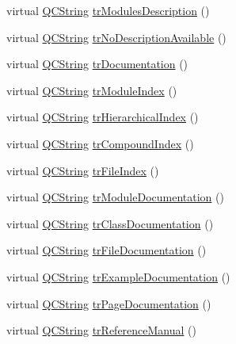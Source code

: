 \begin{DoxyCompactItemize}
\item 
virtual \mbox{\hyperlink{class_q_c_string}{Q\+C\+String}} \mbox{\hyperlink{class_translator_norwegian_adbf4e95c60739c0f92fdcd595f9e6451}{tr\+Modules\+Description}} ()
\item 
virtual \mbox{\hyperlink{class_q_c_string}{Q\+C\+String}} \mbox{\hyperlink{class_translator_norwegian_a69b521875e92a6d28d464f1899a45ed3}{tr\+No\+Description\+Available}} ()
\item 
virtual \mbox{\hyperlink{class_q_c_string}{Q\+C\+String}} \mbox{\hyperlink{class_translator_norwegian_aaeef151315b77ece7d99362d620b72f4}{tr\+Documentation}} ()
\item 
virtual \mbox{\hyperlink{class_q_c_string}{Q\+C\+String}} \mbox{\hyperlink{class_translator_norwegian_a59ac28b655bef6be63d1031aa8716eb6}{tr\+Module\+Index}} ()
\item 
virtual \mbox{\hyperlink{class_q_c_string}{Q\+C\+String}} \mbox{\hyperlink{class_translator_norwegian_af7745b75b85b42d0d9fa02f706f3a705}{tr\+Hierarchical\+Index}} ()
\item 
virtual \mbox{\hyperlink{class_q_c_string}{Q\+C\+String}} \mbox{\hyperlink{class_translator_norwegian_a6d566b4eae7efeff34766a62523ae7cc}{tr\+Compound\+Index}} ()
\item 
virtual \mbox{\hyperlink{class_q_c_string}{Q\+C\+String}} \mbox{\hyperlink{class_translator_norwegian_a2fe4f0090ea4b14ab7624ea3ced45e64}{tr\+File\+Index}} ()
\item 
virtual \mbox{\hyperlink{class_q_c_string}{Q\+C\+String}} \mbox{\hyperlink{class_translator_norwegian_a28824c22c658ed3f6d166de628d202c1}{tr\+Module\+Documentation}} ()
\item 
virtual \mbox{\hyperlink{class_q_c_string}{Q\+C\+String}} \mbox{\hyperlink{class_translator_norwegian_aae6f1f2f29b67ff9410077edbc6910fd}{tr\+Class\+Documentation}} ()
\item 
virtual \mbox{\hyperlink{class_q_c_string}{Q\+C\+String}} \mbox{\hyperlink{class_translator_norwegian_a8c2958c015db8ddd54a00387e6a5faad}{tr\+File\+Documentation}} ()
\item 
virtual \mbox{\hyperlink{class_q_c_string}{Q\+C\+String}} \mbox{\hyperlink{class_translator_norwegian_a8b0d3f953b275be330604a73f4d2367e}{tr\+Example\+Documentation}} ()
\item 
virtual \mbox{\hyperlink{class_q_c_string}{Q\+C\+String}} \mbox{\hyperlink{class_translator_norwegian_a4bc20393742ef7e9a05a8e63ae3b01a3}{tr\+Page\+Documentation}} ()
\item 
virtual \mbox{\hyperlink{class_q_c_string}{Q\+C\+String}} \mbox{\hyperlink{class_translator_norwegian_a9b6f0458a1a819871e240abb2d77b179}{tr\+Reference\+Manual}} ()

\end{DoxyCompactItemize}
